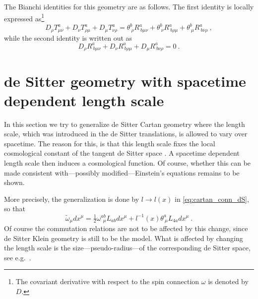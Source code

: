 \documentclass[11pt]{amsart}
\begin{document}
The Bianchi identities for this geometry are as follows. The 
first identity is locally expressed as\footnote{The covariant 
	derivative with respect to the spin connection $\omega$ is 
	denoted by $D$.}
%
\begin{displaymath}
	D_\rho T^a_{\mu\nu} + D_\nu T^a_{\rho\mu} + D_\mu 
	T^a_{\nu\rho} = \theta^b_{~\rho}R^a_{~b\mu\nu} + 
	\theta^b_{~\nu}R^a_{~b\rho\mu} + 
	\theta^b_{~\mu}R^a_{~b\nu\rho}~,
\end{displaymath}
while the second identity is written out as
%
\begin{displaymath}
	D_\rho R^a_{~b\mu\nu} + D_\nu R^a_{~b\rho\mu} + D_\mu 
	R^a_{~b\nu\rho} = 0~.
\end{displaymath}




\section{de Sitter geometry with spacetime dependent length 
	scale}

In this section we try to generalize de Sitter Cartan geometry 
where the length scale, which was introduced in the de Sitter 
translations, is allowed to vary over spacetime. The reason for 
this, is that this length scale fixes the local cosmological 
constant of the tangent de Sitter space \cite{Wise:2010sm}. A 
spacetime dependent length scale then induces a cosmological 
function.  Of course, whether this can be made consistent 
with---possibly modified---Einstein's equations remains to be 
shown.

More precisely, the generalization is done by $l \to l(x)$ in 
\eqref{eq:cartan_conn_dS}, so that
%
\begin{equation}
	\tilde{\omega}_\mu dx^\mu = 
	\tfrac{1}{2}\omega^{ab}_{~~\mu}L_{ab} dx^\mu + 
	l^{-1}(x)\theta^a_{~\mu} L_{4a} dx^\mu~.
\end{equation}
Of course the commutation relations are not to be affected by 
this change, since de Sitter Klein geometry is still to be the 
model.  What is affected by changing the length scale is the 
size---pseudo-radius---of the corresponding de Sitter space, see 
e.g.~\cite{Wise:2010sm}.
\end{document}
